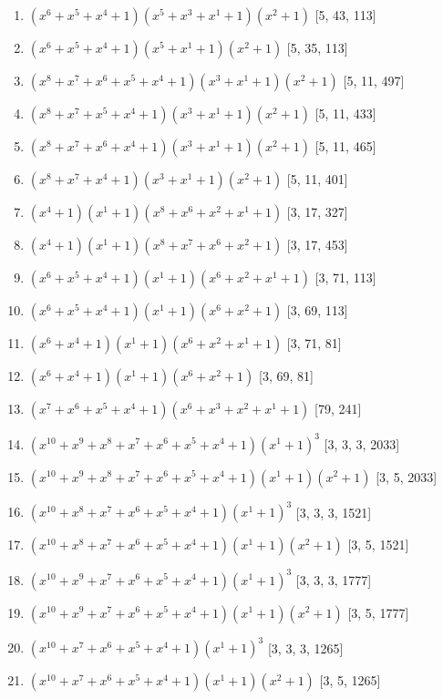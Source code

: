 \documentclass[10pt,twocolumn]{article}
\begin{document}
\begin{enumerate}
\item $(x^{6} + x^{5} + x^{4} + 1)(x^{5} + x^{3} + x^{1} + 1)(x^{2} + 1)$  [5, 43, 113]
\item $(x^{6} + x^{5} + x^{4} + 1)(x^{5} + x^{1} + 1)(x^{2} + 1)$  [5, 35, 113]
\item $(x^{8} + x^{7} + x^{6} + x^{5} + x^{4} + 1)(x^{3} + x^{1} + 1)(x^{2} + 1)$  [5, 11, 497]
\item $(x^{8} + x^{7} + x^{5} + x^{4} + 1)(x^{3} + x^{1} + 1)(x^{2} + 1)$  [5, 11, 433]
\item $(x^{8} + x^{7} + x^{6} + x^{4} + 1)(x^{3} + x^{1} + 1)(x^{2} + 1)$  [5, 11, 465]
\item $(x^{8} + x^{7} + x^{4} + 1)(x^{3} + x^{1} + 1)(x^{2} + 1)$  [5, 11, 401]
\item $(x^{4} + 1)(x^{1} + 1)(x^{8} + x^{6} + x^{2} + x^{1} + 1)$  [3, 17, 327]
\item $(x^{4} + 1)(x^{1} + 1)(x^{8} + x^{7} + x^{6} + x^{2} + 1)$  [3, 17, 453]
\item $(x^{6} + x^{5} + x^{4} + 1)(x^{1} + 1)(x^{6} + x^{2} + x^{1} + 1)$  [3, 71, 113]
\item $(x^{6} + x^{5} + x^{4} + 1)(x^{1} + 1)(x^{6} + x^{2} + 1)$  [3, 69, 113]
\item $(x^{6} + x^{4} + 1)(x^{1} + 1)(x^{6} + x^{2} + x^{1} + 1)$  [3, 71, 81]
\item $(x^{6} + x^{4} + 1)(x^{1} + 1)(x^{6} + x^{2} + 1)$  [3, 69, 81]
\item $(x^{7} + x^{6} + x^{5} + x^{4} + 1)(x^{6} + x^{3} + x^{2} + x^{1} + 1)$  [79, 241]
\item $(x^{10} + x^{9} + x^{8} + x^{7} + x^{6} + x^{5} + x^{4} + 1)(x^{1} + 1)^{3}$  [3, 3, 3, 2033]
\item $(x^{10} + x^{9} + x^{8} + x^{7} + x^{6} + x^{5} + x^{4} + 1)(x^{1} + 1)(x^{2} + 1)$  [3, 5, 2033]
\item $(x^{10} + x^{8} + x^{7} + x^{6} + x^{5} + x^{4} + 1)(x^{1} + 1)^{3}$  [3, 3, 3, 1521]
\item $(x^{10} + x^{8} + x^{7} + x^{6} + x^{5} + x^{4} + 1)(x^{1} + 1)(x^{2} + 1)$  [3, 5, 1521]
\item $(x^{10} + x^{9} + x^{7} + x^{6} + x^{5} + x^{4} + 1)(x^{1} + 1)^{3}$  [3, 3, 3, 1777]
\item $(x^{10} + x^{9} + x^{7} + x^{6} + x^{5} + x^{4} + 1)(x^{1} + 1)(x^{2} + 1)$  [3, 5, 1777]
\item $(x^{10} + x^{7} + x^{6} + x^{5} + x^{4} + 1)(x^{1} + 1)^{3}$  [3, 3, 3, 1265]
\item $(x^{10} + x^{7} + x^{6} + x^{5} + x^{4} + 1)(x^{1} + 1)(x^{2} + 1)$  [3, 5, 1265]

\end{enumerate}
\end{document}
